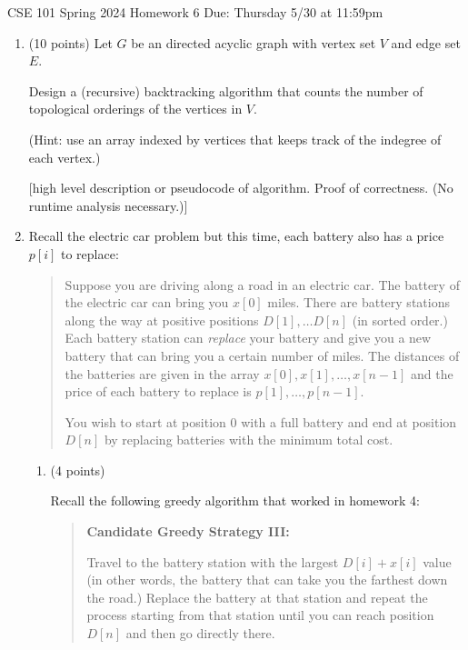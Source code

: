 \documentclass[10pt,letterpaper,unboxed,cm]{article}
\begin{document}
\hfill{CSE 101 Spring 2024}
\hfill{Homework 6 }
\hfill{Due: Thursday 5/30 at 11:59pm}






\begin{enumerate}
\item (10 points)
Let $G$ be an directed acyclic graph with vertex set $V$ and edge set $E$.

Design a (recursive) backtracking algorithm that counts the number of topological orderings of the vertices in $V$.

(Hint: use an array indexed by vertices that keeps track of the indegree of each vertex.)

[high level description or pseudocode of algorithm. Proof of correctness. (No runtime analysis necessary.)]


\item
Recall the electric car problem but this time, each battery also has a price $p[i]$ to replace:

\begin{quote}
Suppose you are driving along a road in an electric car. The battery of the electric car can bring you $x[0]$ miles. There are battery stations along the way at positive positions $D[1],\dots D[n]$ (in sorted order.) Each battery station can  \emph{replace} your battery and give you a new battery that can bring you a certain number of miles. The distances of the batteries are given in the array $x[0],x[1],\dots,x[n-1]$ and the price of each battery to replace is $p[1],\dots,p[n-1]$.

You wish to start at position $0$ with a full battery and end at position $D[n]$ by replacing batteries with the minimum total cost.
\end{quote}


\begin{enumerate}
\item (4 points)

Recall the following greedy algorithm that worked in homework 4:

\begin{quote}
{\bf Candidate Greedy Strategy III:} 

Travel to the battery station with the largest $D[i] + x[i]$ value (in other words, the battery that can take you the farthest down the road.) Replace the battery at that station and repeat the process starting from that station until you can reach position $D[n]$ and then go directly there.
\end{quote}


\end{enumerate}
\end{enumerate}
\end{document}
